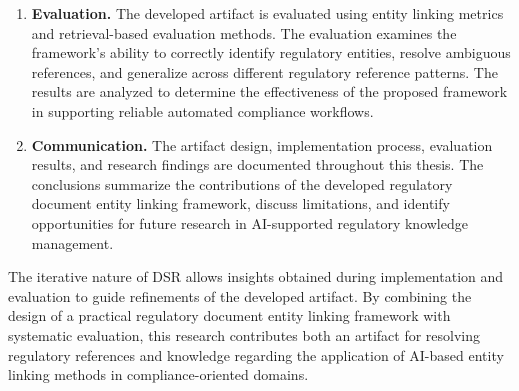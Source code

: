 \begin{enumerate}
    \item \textbf{Evaluation.}
    The developed artifact is evaluated using entity linking metrics and
    retrieval-based evaluation methods. The evaluation examines the framework's
    ability to correctly identify regulatory entities, resolve ambiguous
    references, and generalize across different regulatory reference patterns.
    The results are analyzed to determine the effectiveness of the proposed
    framework in supporting reliable automated compliance workflows.

    \item \textbf{Communication.}
    The artifact design, implementation process, evaluation results, and
    research findings are documented throughout this thesis. The conclusions
    summarize the contributions of the developed regulatory document entity linking
    framework, discuss limitations, and identify opportunities for future
    research in AI-supported regulatory knowledge management.

\end{enumerate}

The iterative nature of DSR allows insights obtained during implementation and
evaluation to guide refinements of the developed artifact. By combining the
design of a practical regulatory document entity linking framework with systematic
evaluation, this research contributes both an artifact for resolving regulatory
references and knowledge regarding the application of AI-based entity linking
methods in compliance-oriented domains.